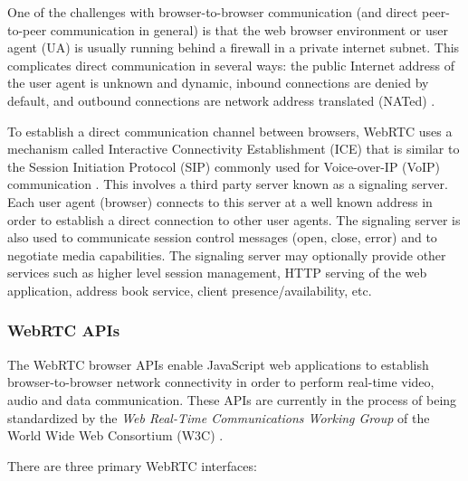 \documentclass[conference,compsoc]{./IEEEtran/IEEEtran}
\begin{document}
One of the challenges with browser-to-browser communication (and
direct peer-to-peer communication in general) is that the web browser
environment or user agent (UA) is usually running behind a firewall in
a private internet subnet. This complicates direct communication in
several ways: the public Internet address of the user agent is unknown
and dynamic, inbound connections are denied by default, and outbound
connections are network address translated (NATed)
\cite[Section~3.4]{draft-rtcweb-transports}.

To establish a direct communication channel between browsers, WebRTC
uses a mechanism called Interactive Connectivity Establishment (ICE)
that is similar to the Session Initiation Protocol (SIP) commonly used
for Voice-over-IP (VoIP) communication \cite{RFC5245:ice}. This
involves a third party server known as a signaling server. Each user
agent (browser) connects to this server at a well known address in
order to establish a direct connection to other user agents. The
signaling server is also used to communicate session control messages
(open, close, error) and to negotiate media capabilities. %
The signaling server may optionally provide other services such as
higher level session management, HTTP serving of the web application,
address book service, client presence/availability, etc. %

\subsubsection{WebRTC APIs}

The WebRTC browser APIs enable JavaScript web applications to
establish browser-to-browser network connectivity in order to perform
real-time video, audio and data communication. These APIs are
currently in the process of being standardized by the \emph{Web
Real-Time Communications Working Group} of the World Wide Web
Consortium (W3C) \cite{webrtc:wg}.

There are three primary WebRTC interfaces:
\end{document}
